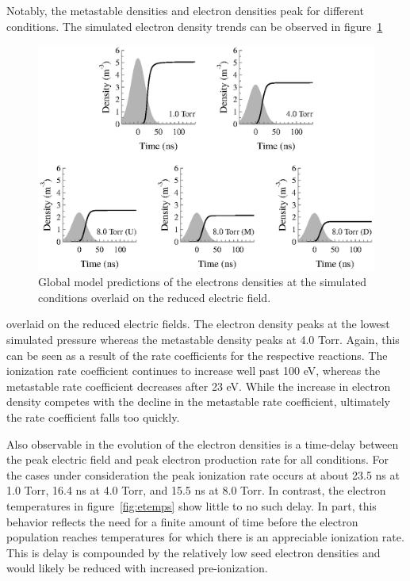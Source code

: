 Notably, the metastable densities and electron densities peak for different
conditions. The simulated electron density trends can be observed in
figure~\ref{fig:necomp}
\begin{figure}
  \centering
  \includegraphics{./chapters/modeling/figures/necomp.eps}
  \caption{Global model predictions of the electrons densities at the simulated
  conditions overlaid on the reduced electric field.}
  \label{fig:necomp}
\end{figure}
overlaid on the reduced electric fields. The electron density peaks at the
lowest simulated pressure whereas the metastable density peaks at 4.0 Torr.
Again, this can be seen as a result of the rate coefficients for the respective
reactions. The ionization rate coefficient continues to increase well past 100
eV, whereas the metastable rate coefficient decreases after 23 eV. While the
increase in electron density competes with the decline in the metastable rate
coefficient, ultimately the rate coefficient falls too quickly. 

Also observable in the evolution of the electron densities is a time-delay
between the peak electric field and peak electron production rate for all
conditions. For the cases under consideration the peak ionization rate occurs at
about 23.5 ns at 1.0 Torr, 16.4 ns at 4.0 Torr, and 15.5 ns at 8.0 Torr. In
contrast, the electron temperatures in figure~\ref{fig:etemps} show little to no
such delay. In part, this behavior reflects the need for a finite amount of time
before the electron population reaches temperatures for which there is an
appreciable ionization rate. This is delay is compounded by the relatively low
seed electron densities and would likely be reduced with increased
pre-ionization.

